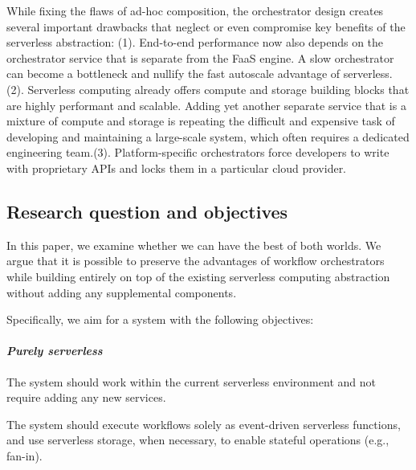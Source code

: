 While fixing the flaws of ad-hoc composition, the orchestrator design creates
several important drawbacks that neglect or even compromise key benefits of
the serverless abstraction: (1). End-to-end performance now also depends on
the orchestrator service that is separate from the FaaS engine. A slow
orchestrator can become a bottleneck and nullify the fast autoscale advantage
of serverless. (2). Serverless computing already offers compute and storage
building blocks that are highly performant and scalable. Adding yet another
separate service that is a mixture of compute and storage is repeating the
difficult and expensive task of developing and maintaining a large-scale system,
which often requires a dedicated engineering team.(3). Platform-specific
orchestrators force developers to write with proprietary APIs and locks them
in a particular cloud provider. 

\subsection{Research question and objectives}

In this paper, we examine whether we can have the best of both worlds. We
argue that it is possible to preserve the advantages of workflow orchestrators
while building entirely on top of the existing serverless computing
abstraction without adding any supplemental components.

Specifically, we aim for a system with the following objectives:

\paragraph{\emph{Purely serverless}} The system should work within the current
serverless environment and not require adding any new services.

The system should execute workflows solely as event-driven serverless
functions, and use serverless storage, when necessary, to enable stateful
operations (e.g., fan-in).

